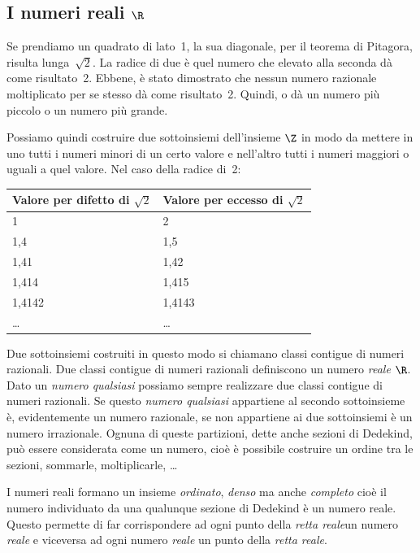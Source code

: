 \subsection{I numeri reali $\R$}
\label{subsec:insnum_reali}

Se prendiamo un quadrato di lato~1, la sua diagonale, per il teorema di 
Pitagora, risulta lunga~$\sqrt{2}$. 
La radice di due è quel numero che elevato alla seconda dà come risultato~2.
Ebbene, è stato dimostrato che nessun numero razionale moltiplicato per se 
stesso dà come risultato~2. Quindi, o dà un numero più piccolo o un numero 
più 
grande.

Possiamo quindi costruire due sottoinsiemi dell'insieme $\Z$ in modo da 
mettere 
in uno tutti i numeri minori di un certo valore e nell'altro tutti i numeri 
maggiori o uguali a quel valore. Nel caso della radice di~2:

\begin{center}
 \begin{tabular}{ll}
\toprule
Valore per difetto di $\sqrt{2}$ &Valore per eccesso di $\sqrt{2}$ \\
\midrule
1& 2\\
1,4& 1,5 \\
1,41& 1,42\\
1,414& 1,415\\
1,4142& 1,4143\\
\ldots& \ldots\\
\bottomrule
\end{tabular}
\end{center}

Due sottoinsiemi costruiti in questo modo si chiamano classi contigue di 
numeri razionali. Due classi contigue di numeri razionali definiscono un 
numero 
\emph{reale} $\R$. Dato un \emph{numero qualsiasi} possiamo sempre realizzare 
due classi contigue di numeri razionali. Se questo \emph{numero qualsiasi} 
appartiene al secondo sottoinsieme è, evidentemente un numero razionale, se 
non 
appartiene ai due sottoinsiemi è un numero irrazionale. Ognuna di queste 
partizioni, dette anche sezioni di Dedekind, può essere considerata come un
numero, cioè è possibile costruire un ordine tra le sezioni, sommarle, 
moltiplicarle, \dots

I numeri reali formano un insieme \emph{ordinato}, \emph{denso} ma anche 
\emph{completo} cioè il numero individuato da una qualunque sezione di 
Dedekind 
è un numero reale.
Questo permette di far corrispondere ad ogni punto della \emph{retta reale}un 
numero \emph{reale} e viceversa 
ad ogni numero \emph{reale} un punto della \emph{retta reale}. 

